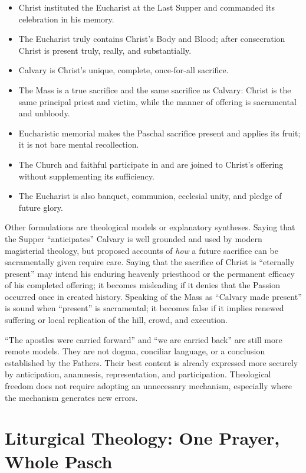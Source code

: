 \begin{deepstudy}
\begin{itemize}
  \item Christ instituted the Eucharist at the Last Supper and commanded its
  celebration in his memory.
  \item The Eucharist truly contains Christ's Body and Blood; after
  consecration Christ is present truly, really, and substantially.
  \item Calvary is Christ's unique, complete, once-for-all sacrifice.
  \item The Mass is a true sacrifice and the same sacrifice as Calvary: Christ
  is the same principal priest and victim, while the manner of offering is
  sacramental and unbloody.
  \item Eucharistic memorial makes the Paschal sacrifice present and applies
  its fruit; it is not bare mental recollection.
  \item The Church and faithful participate in and are joined to Christ's
  offering without supplementing its sufficiency.
  \item The Eucharist is also banquet, communion, ecclesial unity, and pledge
  of future glory.
\end{itemize}

Other formulations are theological models or explanatory syntheses. Saying
that the Supper ``anticipates'' Calvary is well grounded and used by modern
magisterial theology, but proposed accounts of \emph{how} a future sacrifice
can be sacramentally given require care. Saying that the sacrifice of Christ
is ``eternally present'' may intend his enduring heavenly priesthood or the
permanent efficacy of his completed offering; it becomes misleading if it
denies that the Passion occurred once in created history. Speaking of the
Mass as ``Calvary made present'' is sound when ``present'' is sacramental; it
becomes false if it implies renewed suffering or local replication of the
hill, crowd, and execution.

``The apostles were carried forward'' and ``we are carried back'' are still
more remote models. They are not dogma, conciliar language, or a conclusion
established by the Fathers. Their best content is already expressed more
securely by anticipation, anamnesis, representation, and participation.
Theological freedom does not require adopting an unnecessary mechanism,
especially where the mechanism generates new errors.

\section{Liturgical Theology: One Prayer, Whole Pasch}


\end{deepstudy}
